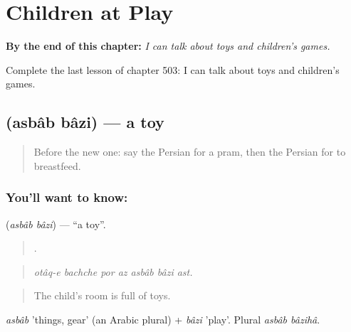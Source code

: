 
\chapter{Children at Play}
\label{ch:fa-children-at-play}

\begin{chapteropening}
\textbf{By the end of this chapter:} \emph{I can talk about toys and children's games.}

Complete the last lesson of chapter 503: I can talk about toys and children's games.
\end{chapteropening}

\section[\texorpdfstring{\fa{اسباب} \fa{بازی} (asbâb bâzi)}{اسباب بازی (asbâb bâzi)}]{  (asbâb bâzi) — a toy}

\label{lesson:FA-C503-asbab-bazi}



\begin{quote}
Before the new one: say the Persian for a pram, then the Persian for to breastfeed.
\end{quote}

\subsection*{You'll want to know:  }
\textbf{ } (\emph{asbâb bâzi}) — \textquotedblleft{}a toy\textquotedblright{}.

\begin{quote}
      .
\end{quote}

\begin{quote}
\emph{otâq-e bachche por az asbâb bâzi ast.}
\end{quote}

\begin{quote}
The child's room is full of toys.
\end{quote}

\emph{asbâb} 'things, gear' (an Arabic plural) + \emph{bâzi} 'play'. Plural \emph{asbâb bâzihâ}.

